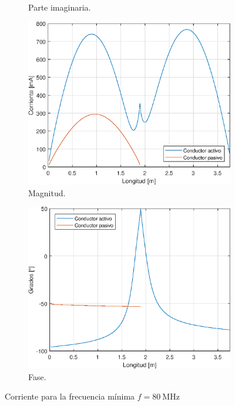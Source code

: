 \begin{figure}[H]
\begin{subfigure}{0.5\textwidth}
		\caption{Parte imaginaria.}
	\end{subfigure}
	\quad
	\begin{subfigure}{0.5\textwidth}
		\includegraphics[scale=0.6]{imagenes/i_mag_80.eps}
		\caption{Magnitud.}
	\end{subfigure}
	\quad
	\begin{subfigure}{0.5\textwidth}
		\includegraphics[scale=0.6]{imagenes/i_fase_80.eps}
		\caption{Fase.}
	\end{subfigure}
	\caption{Corriente para la frecuencia mínima $f = \SI{80}{\mega\hertz}$}
\end{figure}



